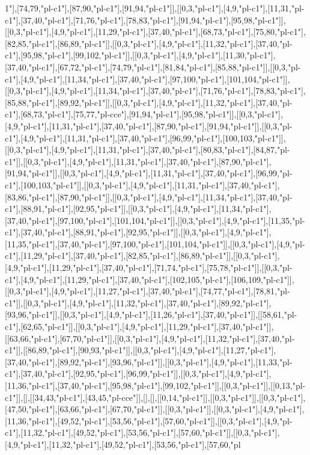 1"],[74,79,"pl-c1"],[87,90,"pl-c1"],[91,94,"pl-c1"]],[[0,3,"pl-c1"],[4,9,"pl-c1"],[11,31,"pl-c1"],[37,40,"pl-c1"],[71,76,"pl-c1"],[78,83,"pl-c1"],[91,94,"pl-c1"],[95,98,"pl-c1"]],[[0,3,"pl-c1"],[4,9,"pl-c1"],[11,29,"pl-c1"],[37,40,"pl-c1"],[68,73,"pl-c1"],[75,80,"pl-c1"],[82,85,"pl-c1"],[86,89,"pl-c1"]],[[0,3,"pl-c1"],[4,9,"pl-c1"],[11,32,"pl-c1"],[37,40,"pl-c1"],[95,98,"pl-c1"],[99,102,"pl-c1"]],[[0,3,"pl-c1"],[4,9,"pl-c1"],[11,30,"pl-c1"],[37,40,"pl-c1"],[67,72,"pl-c1"],[74,79,"pl-c1"],[81,84,"pl-c1"],[85,88,"pl-c1"]],[[0,3,"pl-c1"],[4,9,"pl-c1"],[11,34,"pl-c1"],[37,40,"pl-c1"],[97,100,"pl-c1"],[101,104,"pl-c1"]],[[0,3,"pl-c1"],[4,9,"pl-c1"],[11,34,"pl-c1"],[37,40,"pl-c1"],[71,76,"pl-c1"],[78,83,"pl-c1"],[85,88,"pl-c1"],[89,92,"pl-c1"]],[[0,3,"pl-c1"],[4,9,"pl-c1"],[11,32,"pl-c1"],[37,40,"pl-c1"],[68,73,"pl-c1"],[75,77,"pl-cce"],[91,94,"pl-c1"],[95,98,"pl-c1"]],[[0,3,"pl-c1"],[4,9,"pl-c1"],[11,31,"pl-c1"],[37,40,"pl-c1"],[87,90,"pl-c1"],[91,94,"pl-c1"]],[[0,3,"pl-c1"],[4,9,"pl-c1"],[11,31,"pl-c1"],[37,40,"pl-c1"],[96,99,"pl-c1"],[100,103,"pl-c1"]],[[0,3,"pl-c1"],[4,9,"pl-c1"],[11,31,"pl-c1"],[37,40,"pl-c1"],[80,83,"pl-c1"],[84,87,"pl-c1"]],[[0,3,"pl-c1"],[4,9,"pl-c1"],[11,31,"pl-c1"],[37,40,"pl-c1"],[87,90,"pl-c1"],[91,94,"pl-c1"]],[[0,3,"pl-c1"],[4,9,"pl-c1"],[11,31,"pl-c1"],[37,40,"pl-c1"],[96,99,"pl-c1"],[100,103,"pl-c1"]],[[0,3,"pl-c1"],[4,9,"pl-c1"],[11,31,"pl-c1"],[37,40,"pl-c1"],[83,86,"pl-c1"],[87,90,"pl-c1"]],[[0,3,"pl-c1"],[4,9,"pl-c1"],[11,34,"pl-c1"],[37,40,"pl-c1"],[88,91,"pl-c1"],[92,95,"pl-c1"]],[[0,3,"pl-c1"],[4,9,"pl-c1"],[11,34,"pl-c1"],[37,40,"pl-c1"],[97,100,"pl-c1"],[101,104,"pl-c1"]],[[0,3,"pl-c1"],[4,9,"pl-c1"],[11,35,"pl-c1"],[37,40,"pl-c1"],[88,91,"pl-c1"],[92,95,"pl-c1"]],[[0,3,"pl-c1"],[4,9,"pl-c1"],[11,35,"pl-c1"],[37,40,"pl-c1"],[97,100,"pl-c1"],[101,104,"pl-c1"]],[[0,3,"pl-c1"],[4,9,"pl-c1"],[11,29,"pl-c1"],[37,40,"pl-c1"],[82,85,"pl-c1"],[86,89,"pl-c1"]],[[0,3,"pl-c1"],[4,9,"pl-c1"],[11,29,"pl-c1"],[37,40,"pl-c1"],[71,74,"pl-c1"],[75,78,"pl-c1"]],[[0,3,"pl-c1"],[4,9,"pl-c1"],[11,29,"pl-c1"],[37,40,"pl-c1"],[102,105,"pl-c1"],[106,109,"pl-c1"]],[[0,3,"pl-c1"],[4,9,"pl-c1"],[11,27,"pl-c1"],[37,40,"pl-c1"],[74,77,"pl-c1"],[78,81,"pl-c1"]],[[0,3,"pl-c1"],[4,9,"pl-c1"],[11,32,"pl-c1"],[37,40,"pl-c1"],[89,92,"pl-c1"],[93,96,"pl-c1"]],[[0,3,"pl-c1"],[4,9,"pl-c1"],[11,26,"pl-c1"],[37,40,"pl-c1"]],[[58,61,"pl-c1"],[62,65,"pl-c1"]],[[0,3,"pl-c1"],[4,9,"pl-c1"],[11,29,"pl-c1"],[37,40,"pl-c1"]],[[63,66,"pl-c1"],[67,70,"pl-c1"]],[[0,3,"pl-c1"],[4,9,"pl-c1"],[11,32,"pl-c1"],[37,40,"pl-c1"]],[[86,89,"pl-c1"],[90,93,"pl-c1"]],[[0,3,"pl-c1"],[4,9,"pl-c1"],[11,27,"pl-c1"],[37,40,"pl-c1"],[89,92,"pl-c1"],[93,96,"pl-c1"]],[[0,3,"pl-c1"],[4,9,"pl-c1"],[11,33,"pl-c1"],[37,40,"pl-c1"],[92,95,"pl-c1"],[96,99,"pl-c1"]],[[0,3,"pl-c1"],[4,9,"pl-c1"],[11,36,"pl-c1"],[37,40,"pl-c1"],[95,98,"pl-c1"],[99,102,"pl-c1"]],[[0,3,"pl-c1"]],[[0,13,"pl-c1"]],[],[[34,43,"pl-c1"],[43,45,"pl-cce"]],[],[],[[0,14,"pl-c1"]],[[0,3,"pl-c1"]],[[0,3,"pl-c1"],[47,50,"pl-c1"],[63,66,"pl-c1"],[67,70,"pl-c1"]],[[0,3,"pl-c1"]],[[0,3,"pl-c1"],[4,9,"pl-c1"],[11,36,"pl-c1"],[49,52,"pl-c1"],[53,56,"pl-c1"],[57,60,"pl-c1"]],[[0,3,"pl-c1"],[4,9,"pl-c1"],[11,32,"pl-c1"],[49,52,"pl-c1"],[53,56,"pl-c1"],[57,60,"pl-c1"]],[[0,3,"pl-c1"],[4,9,"pl-c1"],[11,32,"pl-c1"],[49,52,"pl-c1"],[53,56,"pl-c1"],[57,60,"pl